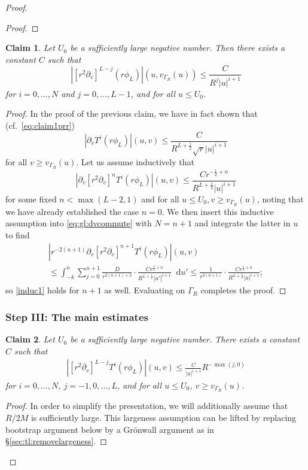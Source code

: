 \documentclass[11pt,english]{article}
\numberwithin{equation}{section}
\theoremstyle{remark}
\theoremstyle{plain}
\newtheorem{claim}{Claim}
\theoremstyle{remark}
\newcommand{\dd}{\mathop{}\!\mathrm{d}}
\newcommand{\pv}{\partial_v}
\renewcommand{\(}{\left(}
\renewcommand{\)}{\right)}
\begin{document}
\begin{proof}
\begin{proof}
\end{proof}
	\begin{claim}\label{claim2}
	Let $U_0$ be a sufficiently large negative number. Then there exists a constant $C$ such that 
	\begin{equation}
	\left|[r^2\pv]^{L-j}(r\phi_L)\right|(u,v_{\Gamma_R}(u))\leq\frac{C}{R^{j}|u|^{i+1}}\label{eq:proof:gtl:claim2}
	\end{equation}
	for $i=0, \dots, N$ and $j=0,\dots, L-1$, and for all $u\leq U_0$.
	\end{claim}
\begin{proof}
In the proof of the previous claim, we have in fact shown that (cf.\ \eqref{eq:claim1prr})
\begin{equation}
\left|\pv T^i(r\phi_L)\right|(u,v)\leq \frac{C}{R^{L+\frac12}\sqrt{r}|u|^{i+1}}
\end{equation}
for all $v\geq v_{\Gamma_R}(u)$.
Let us assume inductively that 
\begin{equation}\label{induc1}
\left|\pv[r^2\pv]^n T^i(r\phi_L)\right|(u,v)\leq \frac{Cr^{-\frac12+n}}{R^{L+\frac12}|u|^{i+1}}
\end{equation}
for some fixed $n<\max(L-2,1)$ and for all $u\leq U_0, v\geq v_{\Gamma_R}(u)$, noting that we have already established the case $n=0$. 
We then insert this inductive assumption into \eqref{eq:gl:dvcommute} with $N=n+1$ and integrate the latter in $u$ to find
\begin{multline*}
\left|r^{-2(n+1)}\pv[r^2\pv]^{n+1} T^i(r\phi_L)\right|(u,v) \\\leq
\int_{-k}^u \sum_{j=0}^{n+1}\frac{D}{r^{2(n+1)+2}}\cdot\frac{Cr^{\frac32+n}}{R^{L+\frac12}|u'|^{i+1}}\dd u'\leq \frac{1}{r^{2(n+1)}}\cdot\frac{C r^{\frac{1}{2}+n}}{R^{L+\frac{1}{2}}|u|^{i+1}};
\end{multline*}
so \eqref{induc1} holds for $n+1$ as well. Evaluating on $\Gamma_R$ completes the proof.
\end{proof}
\subsubsection*{Step III: The main estimates}
	\begin{claim}\label{claim3}
	Let $U_0$ be a sufficiently large negative number. There exists a constant $C$ such that 
	\begin{align}\label{eq:proof:gtl:claim3}
	\left|[r^2\pv]^{L-j}T^i(r\phi_L)\right|(u,v)\leq \frac{C}{|u|^{i+1}}R^{-\max{(j,0)}}
	\end{align}
	for $i=0,\dots, N$, $j=-1,0,\dots, L$, and for all $u\leq U_0$, $v\geq v_{\Gamma_R}(u)$. 
	\end{claim}
\begin{proof}
In order to simplify the presentation, we will additionally assume that $R/2M$ is sufficiently large. This largeness assumption can be lifted by replacing bootstrap argument below by a  Gr\"onwall argument as in \S \ref{sec:tl:removelargeness}.


\end{proof}
\end{proof}
\end{document}
